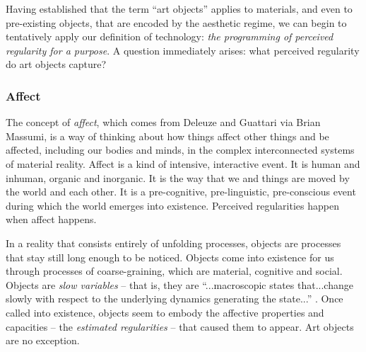 \documentclass[letterpaper]{article}
\begin{document}
    Having established that the term “art objects” applies to materials, and even to pre-existing objects, that are encoded by the aesthetic regime, we can begin to tentatively apply our definition of technology: \emph{the programming of perceived regularity for a purpose}. A question immediately arises: what perceived regularity do art objects capture?

    \subsubsection{Affect}

    The concept of \emph{affect}, which comes from Deleuze and Guattari via Brian Massumi, is a way of thinking about how things affect other things and be affected, including our bodies and minds, in the complex interconnected systems of material reality. Affect is a kind of intensive, interactive event. It is human and inhuman, organic and inorganic. It is the way that we and things are moved by the world and each other. It is a pre-cognitive, pre-linguistic, pre-conscious event during which the world emerges into existence. Perceived regularities happen when affect happens.
    
    In a reality that consists entirely of unfolding processes, objects are processes that stay still long enough to be noticed. Objects come into existence for us through processes of coarse-graining, which are material, cognitive and social. Objects are \emph{slow variables} – that is, they are “...macroscopic states that...change slowly with respect to the underlying dynamics generating the state...” \citep[p.61]{FlackEtAlTmsclsSymmtryUncrtnty2013}. Once called into existence, objects seem to embody the affective properties and capacities – the \emph{estimated regularities} \citep[p.9]{FlackCrsGrnng2017} – that caused them to appear. Art objects are no exception.
\end{document}
